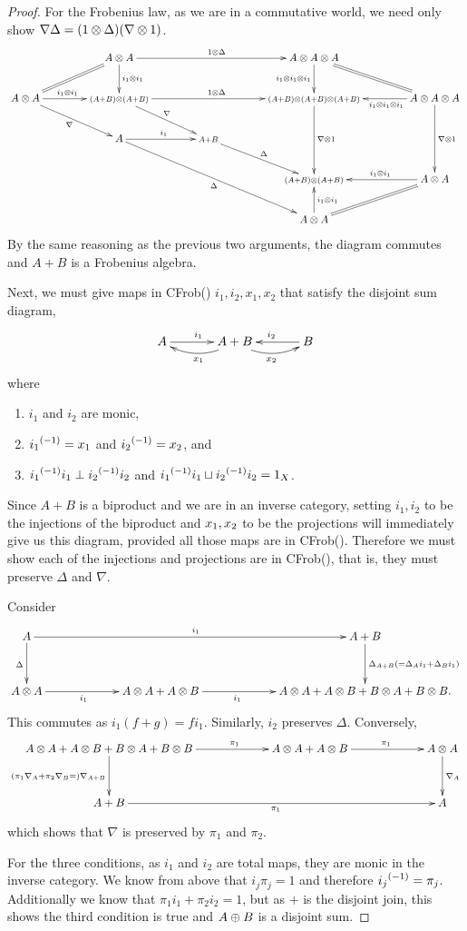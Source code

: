 \begin{proof}
  For the Frobenius law, as we are in a commutative world, we need only show
  $\nabla \Delta = (1\otimes\Delta)(\nabla\otimes1)$.
  \[
  \xymatrix@C+17pt{
      &A\*A \ar@{=}[ld] \ar[rr]^{1\*\Delta} \ar[d]^{i_1\*i_1} && A\*A\*A  \ar[d]_{i_1\*i_1\*i_1} \ar@{=}[dr] \\
      A\*A \ar[r]^(.45){i_1\*i_1}  \ar[dr]_{\nabla}
         &\scriptstyle{(A+B)\*(A+B)} \ar[rr]^{1\*\Delta} \ar[dr]^{\nabla}
         &&\scriptstyle{(A+B)\*(A+B)\*(A+B)}  \ar[dd]^{\nabla\*1} & A\*A\*A  \ar[l]^(.4){i_1\*i_1\*i_1}  \ar[dd]^{\nabla\*1}\\
     & A \ar[r]^{i_1} \ar[ddrr]_{\Delta} & \scriptstyle{A+B} \ar[dr]^{\Delta} \\
     & & & \scriptstyle{(A+B)\*(A+B)} & A\*A  \ar[l]_(.45){i_1\*i_1} \ar@{=}[dl]\\
     & & & A\*A \ar[u]_{i_1\*i_1}
    }
  \]
  By the same reasoning as the previous two arguments, the diagram commutes and $A+B$ is a Frobenius
  algebra.

  Next, we must give maps in CFrob(\X) $i_1,i_2,x_1,x_2$ that satisfy the disjoint sum diagram,
  \[
    \xymatrix@C+10pt{
      A\ar[r]^{i_1} &A+B\ar@/^9pt/[l]^{x_1} \ar@/_9pt/[r]_{x_2} & B \ar[l]_{i_2}
    }
  \]
  where
  \begin{enumerate}[{(}i{)}]
    \item $i_1$ and $i_2$ are monic,
    \item ${i_1}^{(-1)} = x_1$ and ${i_2}^{(-1)} = x_2$, and
    \item ${i_1}^{(-1)}i_1 \perp {i_2}^{(-1)}i_2$ and ${i_1}^{(-1)}i_1 \sqcup {i_2}^{(-1)}i_2 = 1_X$.
  \end{enumerate}

  Since $A+B$ is a biproduct and we are in an inverse category, setting $i_1,i_2$ to be the
  injections of the biproduct and $x_1,x_2$ to be the projections will immediately give us this
  diagram, provided all those maps are in CFrob(\X). Therefore we must show each of the injections
  and projections are in CFrob(\X), that is, they must preserve $\Delta$ and $\nabla$.

  Consider
  \[
     \xymatrix@C+40pt@R+10pt{
       A \ar[d]_{\Delta} \ar[rr]^{i_1} & &A+B \ar[d]^{\Delta_{A+B}(=\Delta_A i_1 + \Delta_B i_1)}\\
       A\*A \ar[r]_(.425){i_1} &A\*A+A\*B \ar[r]_(.375){i_1} & A\*A+A\*B+B\*A+B\*B.
     }
  \]
  This commutes as $i_1(f+g) = f i_1$. Similarly, $i_2$ preserves $\Delta$.
  Conversely,
  \[
    \xymatrix@C+40pt@R+10pt{
       {A\*A+A\*B+B\*A+B\*B}  \ar[d]_{(\pi_1\nabla_A + \pi_2\nabla_B=)\nabla_{A+B}} \ar[r]^(.625){\pi_1}
         &A\*A+A\*B \ar[r]^(.575){\pi_1} &A\*A\ar[d]^{\nabla_A}\\
       A+B \ar[rr]_{\pi_1}& & A
    }
  \]
  which shows that $\nabla$ is preserved by $\pi_1$ and $\pi_2$.

  For the three conditions, as $i_1$ and $i_2$ are total maps, they are monic in the inverse
  category. We know from above that $i_j\pi_j = 1$ and therefore ${i_j}^{(-1)} = \pi_j$. Additionally
  we know that $\pi_1i_1 + \pi_2i_2 = 1$, but as $+$ is the disjoint join, this shows the third
  condition is true and $A\oplus B$ is a disjoint sum.
\end{proof}


